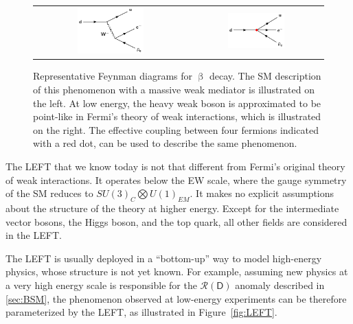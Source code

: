 \begin{figure}[tbh!]
 \begin{center}
 \begin{tabular}{cc}
 \includegraphics[width=0.45\textwidth]{figures/Part1/EFT/BetaDecay}&
 \includegraphics[width=0.45\textwidth]{figures/Part1/EFT/FermiTheory}\\
 \end{tabular}
 \caption{Representative Feynman diagrams for $\upbeta$ decay. The \ac{SM} description of this phenomenon with a massive weak mediator is illustrated on the left. At low energy, the heavy weak boson is approximated to be point-like in Fermi's theory of weak interactions, which is illustrated on the right. The effective coupling between four fermions indicated with a red dot, can be used to describe the same phenomenon.}
 \label{fig:FermiEFT}
 \end{center}
\end{figure}

The \ac{LEFT} that we know today is not that different from Fermi's original theory of weak interactions. It operates below the \ac{EW} scale, where the gauge symmetry of the \ac{SM} reduces to $SU(3)_{C}\bigotimes U(1)_{EM}$. It makes no explicit assumptions about the structure of the theory at higher energy. Except for the intermediate vector bosons, the Higgs boson, and the top quark, all other fields are considered in the \ac{LEFT}. 

The \ac{LEFT} is usually deployed in a ``bottom-up'' way to model high-energy physics, whose structure is not yet known. For example, assuming new physics at a very high energy scale is responsible for the $\mathcal{R}(\textsf{D})$ anomaly described in \autoref{sec:BSM}, the phenomenon observed at low-energy experiments can be therefore parameterized by the \ac{LEFT}, as illustrated in Figure~\ref{fig:LEFT}.

